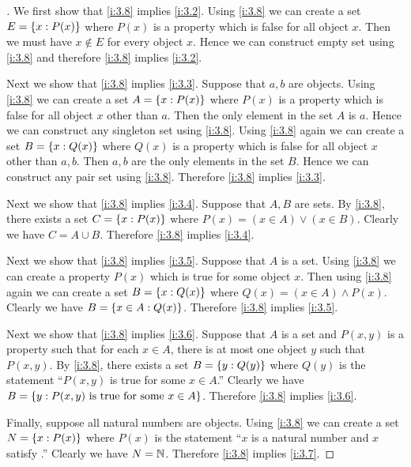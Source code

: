 \begin{proof}[]
  We first show that \cref{i:3.8} implies \cref{i:3.2}.
  Using \cref{i:3.8} we can create a set \(E = \left\lbrace x : P(x)\right\rbrace\) where \(P(x)\) is a property which is false for all object \(x\).
  Then we must have \(x \notin E\) for every object \(x\).
  Hence we can construct empty set using \cref{i:3.8} and therefore \cref{i:3.8} implies \cref{i:3.2}.

  Next we show that \cref{i:3.8} implies \cref{i:3.3}.
  Suppose that \(a, b\) are objects.
  Using \cref{i:3.8} we can create a set \(A = \left\lbrace x : P(x)\right\rbrace\) where \(P(x)\) is a property which is false for all object \(x\) other than \(a\).
  Then the only element in the set \(A\) is \(a\).
  Hence we can construct any singleton set using \cref{i:3.8}.
  Using \cref{i:3.8} again we can create a set \(B = \left\lbrace x : Q(x)\right\rbrace\) where \(Q(x)\) is a property which is false for all object \(x\) other than \(a, b\).
  Then \(a, b\) are the only elements in the set \(B\).
  Hence we can construct any pair set using \cref{i:3.8}.
  Therefore \cref{i:3.8} implies \cref{i:3.3}.

  Next we show that \cref{i:3.8} implies \cref{i:3.4}.
  Suppose that \(A, B\) are sets.
  By \cref{i:3.8}, there exists a set \(C = \left\lbrace x : P(x)\right\rbrace\) where \(P(x) = (x \in A) \lor (x \in B)\).
  Clearly we have \(C = A \cup B\).
  Therefore \cref{i:3.8} implies \cref{i:3.4}.

  Next we show that \cref{i:3.8} implies \cref{i:3.5}.
  Suppose that \(A\) is a set.
  Using \cref{i:3.8} we can create a property \(P(x)\) which is true for some object \(x\).
  Then using \cref{i:3.8} again we can create a set \(B = \left\lbrace x : Q(x)\right\rbrace\) where \(Q(x) = (x \in A) \land P(x)\).
  Clearly we have \(B = \left\lbrace x \in A : Q(x)\right\rbrace\).
  Therefore \cref{i:3.8} implies \cref{i:3.5}.

  Next we show that \cref{i:3.8} implies \cref{i:3.6}.
  Suppose that \(A\) is a set and \(P(x, y)\) is a property such that for each \(x \in A\), there is at most one object \(y\) such that \(P(x, y)\).
  By \cref{i:3.8}, there exists a set \(B = \left\lbrace y : Q(y)\right\rbrace\) where \(Q(y)\) is the statement ``\(P(x, y)\) is true for some \(x \in A\).''
  Clearly we have \(B = \left\lbrace y : P(x, y) \text{ is true for some } x \in A\right\rbrace\).
  Therefore \cref{i:3.8} implies \cref{i:3.6}.

  Finally, suppose all natural numbers are objects.
  Using \cref{i:3.8} we can create a set \(N = \left\lbrace x : P(x)\right\rbrace\) where \(P(x)\) is the statement ``\(x\) is a natural number and \(x\) satisfy .''
  Clearly we have \(N = \mathbb{N}\).
  Therefore \cref{i:3.8} implies \cref{i:3.7}.
\end{proof}

